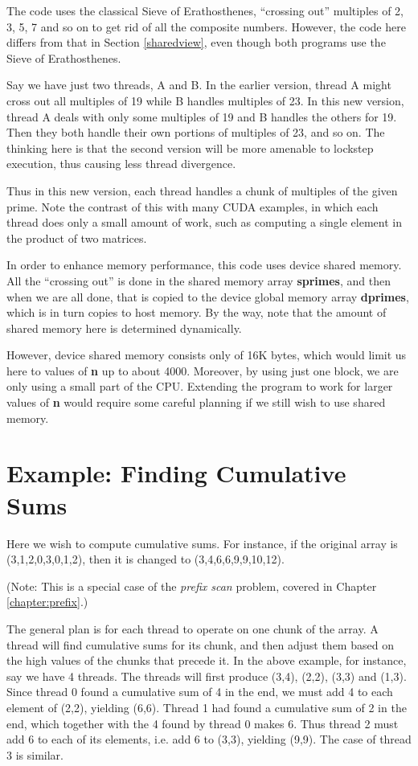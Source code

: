 The code uses the classical Sieve of Erathosthenes, ``crossing out''
multiples of 2, 3, 5, 7 and so on to get rid of all the composite
numbers.  However, the code here differs from that in Section
\ref{sharedview}, even though both programs use the Sieve of
Erathosthenes.  

Say we have just two threads, A and B.  In the earlier version, thread A
might cross out all multiples of 19 while B handles multiples of 23.  In
this new version, thread A deals with only some multiples of 19 and B
handles the others for 19.  Then they both handle their own portions of
multiples of 23, and so on.  The thinking here is that the second
version will be more amenable to lockstep execution, thus causing less
thread divergence.

Thus in this new version, each thread handles a chunk of multiples of
the given prime.  Note the contrast of this with many CUDA examples, in
which each thread does only a small amount of work, such as computing a
single element in the product of two matrices.

In order to enhance memory performance, this code uses device shared
memory.  All the ``crossing out'' is done in the shared memory array
{\bf sprimes}, and then when we are all done, that is copied to the
device global memory array {\bf dprimes}, which is in turn copies to
host memory.  By the way, note that the amount of shared memory here is
determined dynamically.

However, device shared memory consists only of 16K bytes, which would
limit us here to values of {\bf n} up to about 4000.  Moreover, by using
just one block, we are only using a small part of the CPU.  Extending
the program to work for larger values of {\bf n} would require some
careful planning if we still wish to use shared memory.  

\section{Example:  Finding Cumulative Sums}
\label{cumulsums}

Here we wish to compute cumulative sums.  For instance, if the original
array is (3,1,2,0,3,0,1,2), then it is changed to (3,4,6,6,9,9,10,12).

(Note:  This is a special case of the {\it prefix scan} problem, covered
in Chapter \ref{chapter:prefix}.)

The general plan is for each thread to operate on one
chunk of the array.  A thread will find cumulative sums for its chunk,
and then adjust them based on the high values of the chunks that precede
it.  In the above example, for instance, say we have 4 threads.  The
threads will first produce (3,4), (2,2), (3,3) and (1,3).  Since thread
0 found a cumulative sum of 4 in the end, we must add 4 to each element
of (2,2), yielding (6,6).  Thread 1 had found a cumulative sum of 2 in
the end, which together with the 4 found by thread 0 makes 6.  Thus
thread 2 must add 6 to each of its elements, i.e. add 6 to (3,3),
yielding (9,9).  The case of thread 3 is similar.

